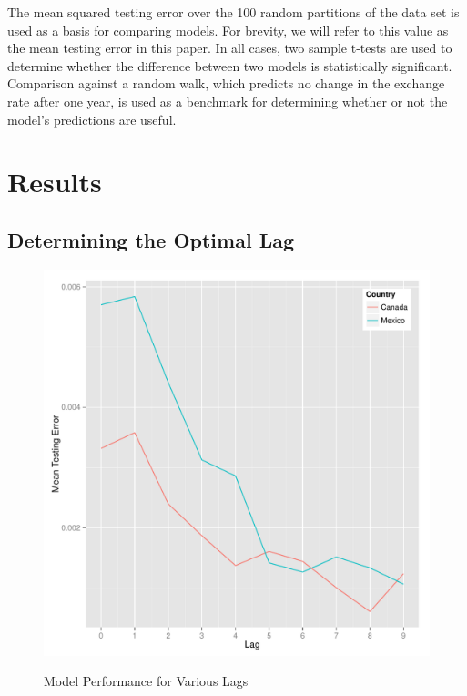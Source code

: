 \documentclass{sig-alternate-05-2015}
\begin{document}
\par{} The mean squared testing error over the 100 random partitions of the data set is used as a basis for comparing models. For brevity, we will refer to this value as the mean testing error in this paper. In all cases, two sample t-tests are used to determine whether the difference between two models is statistically significant. Comparison against a random walk, which predicts no change in the exchange rate after one year, is used as a benchmark for determining whether or not the model's predictions are useful.

\section{Results}

\subsection{Determining the Optimal Lag}


\begin{figure}
\centering
\caption{Model Performance for Various Lags}
\includegraphics[scale=0.45]{lag1.pdf}
\label{fig:lag1}
\end{figure}
\end{document}

